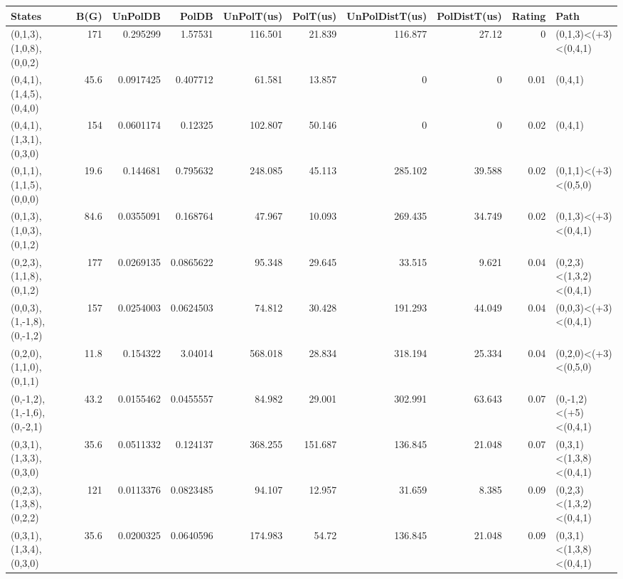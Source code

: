 \begin{tabular}{lrrrrrrrrl}
\hline
 States                     &   B(G) &   UnPolDB &     PolDB &   UnPolT(us) &   PolT(us) &   UnPolDistT(us) &   PolDistT(us) &   Rating & Path                    \\
\hline
 (0,1,3),(1,0,8),(0,0,2)    &  171   & 0.295299  & 1.57531   &      116.501 &     21.839 &          116.877 &         27.12  &     0    & (0,1,3)<(+3)<(0,4,1)    \\
 (0,4,1),(1,4,5),(0,4,0)    &   45.6 & 0.0917425 & 0.407712  &       61.581 &     13.857 &            0     &          0     &     0.01 & (0,4,1)                 \\
 (0,4,1),(1,3,1),(0,3,0)    &  154   & 0.0601174 & 0.12325   &      102.807 &     50.146 &            0     &          0     &     0.02 & (0,4,1)                 \\
 (0,1,1),(1,1,5),(0,0,0)    &   19.6 & 0.144681  & 0.795632  &      248.085 &     45.113 &          285.102 &         39.588 &     0.02 & (0,1,1)<(+3)<(0,5,0)    \\
 (0,1,3),(1,0,3),(0,1,2)    &   84.6 & 0.0355091 & 0.168764  &       47.967 &     10.093 &          269.435 &         34.749 &     0.02 & (0,1,3)<(+3)<(0,4,1)    \\
 (0,2,3),(1,1,8),(0,1,2)    &  177   & 0.0269135 & 0.0865622 &       95.348 &     29.645 &           33.515 &          9.621 &     0.04 & (0,2,3)<(1,3,2)<(0,4,1) \\
 (0,0,3),(1,-1,8),(0,-1,2)  &  157   & 0.0254003 & 0.0624503 &       74.812 &     30.428 &          191.293 &         44.049 &     0.04 & (0,0,3)<(+3)<(0,4,1)    \\
 (0,2,0),(1,1,0),(0,1,1)    &   11.8 & 0.154322  & 3.04014   &      568.018 &     28.834 &          318.194 &         25.334 &     0.04 & (0,2,0)<(+3)<(0,5,0)    \\
 (0,-1,2),(1,-1,6),(0,-2,1) &   43.2 & 0.0155462 & 0.0455557 &       84.982 &     29.001 &          302.991 &         63.643 &     0.07 & (0,-1,2)<(+5)<(0,4,1)   \\
 (0,3,1),(1,3,3),(0,3,0)    &   35.6 & 0.0511332 & 0.124137  &      368.255 &    151.687 &          136.845 &         21.048 &     0.07 & (0,3,1)<(1,3,8)<(0,4,1) \\
 (0,2,3),(1,3,8),(0,2,2)    &  121   & 0.0113376 & 0.0823485 &       94.107 &     12.957 &           31.659 &          8.385 &     0.09 & (0,2,3)<(1,3,2)<(0,4,1) \\
 (0,3,1),(1,3,4),(0,3,0)    &   35.6 & 0.0200325 & 0.0640596 &      174.983 &     54.72  &          136.845 &         21.048 &     0.09 & (0,3,1)<(1,3,8)<(0,4,1) \\
\hline
\end{tabular}